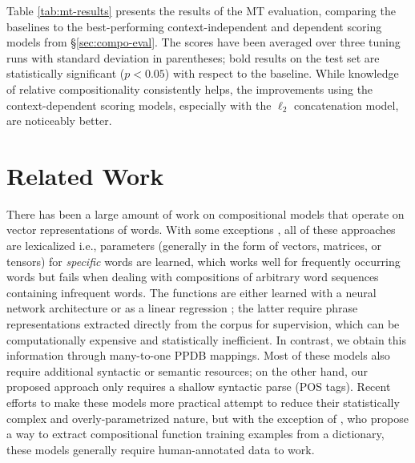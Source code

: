 \documentclass[11pt]{article}
\begin{document}
Table \ref{tab:mt-results} presents the results of the MT evaluation, comparing the baselines to the best-performing context-independent and dependent scoring models from \S\ref{sec:compo-eval}. 
The scores have been averaged over three tuning runs with standard deviation in parentheses; bold results on the test set are statistically significant ($p < 0.05$) with respect to the baseline. 
While knowledge of relative compositionality consistently helps, the improvements using the context-dependent scoring models, especially with the $\ell_2$ concatenation model, are noticeably better. 

\section{Related Work}

There has been a large amount of work on compositional models that operate on vector representations of words. 
With some exceptions \cite{Mitchell2008,Mitchell2010}, all of these approaches are lexicalized i.e., parameters (generally in the form of vectors, matrices, or tensors) for \emph{specific} words are learned, which works well for frequently occurring words but fails when dealing with compositions of arbitrary word sequences containing infrequent words. 
The functions are either learned with a neural network architecture \cite[\emph{inter alia}]{Socher2013} or as a linear regression \cite{Baroni2010}; the latter require phrase representations extracted directly from the corpus for supervision, which can be computationally expensive and statistically inefficient. 
In contrast, we obtain this information through many-to-one PPDB mappings. 
Most of these models also require additional syntactic \cite{Socher2012} or semantic \cite{Hermann2013,Grefenstette2013} resources; on the other hand, our proposed approach only requires a shallow syntactic parse (POS tags).  
Recent efforts to make these models more practical \cite{Paperno2014} attempt to reduce their statistically complex and overly-parametrized nature, but with the exception of , who propose a way to extract compositional function training examples from a dictionary, these models generally require human-annotated data to work.  
\end{document}
